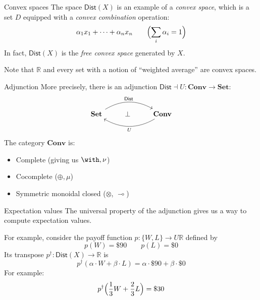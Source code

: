 \documentclass[aspectratio=1610,mathserif]{beamer}
\begin{document}
\begin{frame}{Convex spaces}
  The space $\mathsf{Dist}(X)$ is an example of a \emph{convex space},
  which is a set $D$ equipped with a \emph{convex combination} operation:
  \[
    \alpha_1 x_1 + \cdots + \alpha_n x_n
    \qquad
    \Bigl( \sum_i \alpha_i = 1 \Bigr)
  \]
  In fact, $\mathsf{Dist}(X)$ is the \emph{free convex space}
  generated by $X$.

  \vspace{1em}
  Note that $\mathbb{R}$ and every set with a notion of
  ``weighted average'' are convex spaces.
\end{frame}

\begin{frame}[fragile]{Adjunction}
  More precisely, there is an adjunction
  $\mathsf{Dist} \dashv U : \mathbf{Conv} \rightarrow \mathbf{Set}$:
  \[
    \begin{tikzcd}
      \mathbf{Set} \ar[rr, bend left, "\mathsf{Dist}"] &
      \bot &
      \mathbf{Conv} \ar[ll, bend left, "U"]
    \end{tikzcd}
  \]
  The category $\mathbf{Conv}$ is:
  \begin{itemize}
    \item Complete (giving us $\with, \nu$)
    \item Cocomplete ($\oplus, \mu$)
    \item Symmetric monoidal closed ($\otimes$, $\multimap$)
  \end{itemize}
\end{frame}

\begin{frame}{Expectation values}
  The universal property of the adjunction gives us a way
  to compute expectation values.

  For example, consider the payoff function
  $p : \{W,L\} \rightarrow U\mathbb{R}$
  defined by
  \[ p(W) = \$90 \qquad p(L) = \$0 \]
  Its transpose $p^\dagger : \mathsf{Dist}(X) \rightarrow \mathbb{R}$
  is
  \[ p^\dagger(\alpha \cdot W + \beta \cdot L) =
     \alpha \cdot \$90 + \beta \cdot \$0 \]
  For example:
  \[ p^\dagger \Bigl( \frac{1}{3} W + \frac{2}{3} L \Bigr) =
      \$30 \]
\end{frame}

\end{document}
